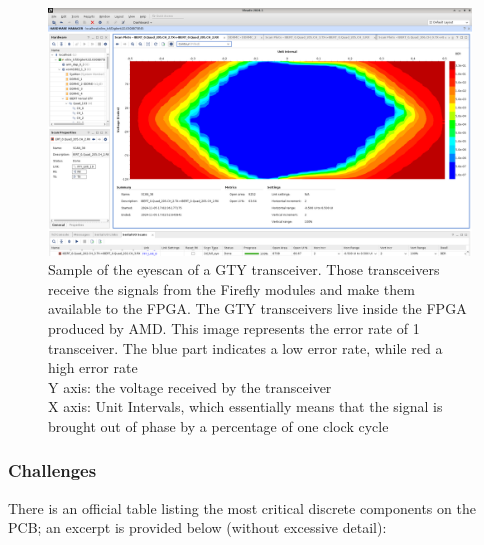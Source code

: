 \begin{figure}[H]
\centering
\includegraphics[width=\textwidth]{images/contributions/eyescan.png}
\caption[Sample of the eyescan of a GTY transceiver]{Sample of the eyescan of a GTY transceiver. Those transceivers receive the signals from the Firefly \protect\cite{firefly-optical-transceiver} modules and make them available to the FPGA. The GTY transceivers live inside the FPGA produced by AMD. This image represents the error rate of 1 transceiver. The blue part indicates a low error rate, while red a high error rate\\
Y axis: the voltage received by the transceiver\\
X axis: Unit Intervals, which essentially means that the signal is brought out of phase by a percentage of one clock cycle}
\label{fig:eyescan-test}
\end{figure}


\subsubsection{Challenges}

There is an official table listing the most critical discrete components on the \ac{PCB}; an excerpt is provided below (without excessive detail):


